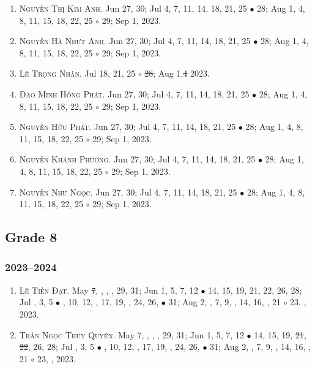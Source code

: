\documentclass{article}
\begin{document}
\begin{enumerate}
	\item \textsc{Nguyễn Thị Kim Anh.} {\sf[In]} Jun 27, 30; Jul 4, 7, 11, 14, 18, 21, 25 $\bullet$ 28; Aug 1, 4, 8, 11, 15, 18, 22, 25 $\circ$ 29; Sep 1, 2023.
	\item \textsc{Nguyễn Hà Nhựt Anh.} {\sf[In]} Jun 27, 30; Jul 4, 7, 11, 14, 18, 21, 25 $\bullet$ 28; Aug 1, 4, 8, 11, 15, 18, 22, 25 $\circ$ 29; Sep 1, 2023.
	\item \textsc{Lê Trọng Nhân.} {\sf[In]} Jul 18, 21, 25 $\circ$ \st{28}; Aug 1,\st{4} \sf{[Out]} 2023.
	\item \textsc{Đào Minh Hồng Phát.} {\sf[In]} Jun 27, 30; Jul 4, 7, 11, 14, 18, 21, 25 $\bullet$ 28; Aug 1, 4, 8, 11, 15, 18, 22, 25 $\circ$ 29; Sep 1, 2023.
	\item \textsc{Nguyễn Hữu Phát.} {\sf[In]} Jun 27, 30; Jul 4, 7, 11, 14, 18, 21, 25 $\bullet$ 28; Aug 1, 4, 8, 11, 15, 18, 22, 25 $\circ$ 29; Sep 1, 2023.	
	\item \textsc{Nguyễn Khánh Phương.} {\sf[In]} Jun 27, 30; Jul 4, 7, 11, 14, 18, 21, 25 $\bullet$ 28; Aug 1, 4, 8, 11, 15, 18, 22, 25 $\circ$ 29; Sep 1, 2023.
	\item \textsc{Nguyễn Như Ngọc.} {\sf[In]} Jun 27, 30; Jul 4, 7, 11, 14, 18, 21, 25 $\bullet$ 28; Aug 1, 4, 8, 11, 15, 18, 22, 25 $\circ$ 29; Sep 1, 2023.
\end{enumerate}


\subsection{Grade 8}

\subsubsection{2023--2024}

\begin{enumerate}
	\item \textsc{Lê Tiến Đạt.} May \st{7}, , , , 29, 31; Jun 1, 5, 7, 12 $\bullet$ 14, 15, 19, 21, 22, 26, 28; Jul , 3, 5 $\bullet$ , 10, 12, , 17, 19, , 24, 26,  $\bullet$ 31; Aug 2, , 7, 9, , 14, 16, , 21 $\circ$ 23. , 2023.
	\item \textsc{Trần Ngọc Thúy Quyên.} May 7, , , , 29, 31; Jun 1, 5, 7, 12 $\bullet$ 14, 15, 19, \st{21}, \st{22}, 26, 28; Jul , 3, 5 $\bullet$ , 10, 12, , 17, 19, , 24, 26,  $\bullet$ 31; Aug 2, , 7, 9, , 14, 16, , 21 $\circ$ 23, , 2023.
\end{enumerate}
\end{document}
